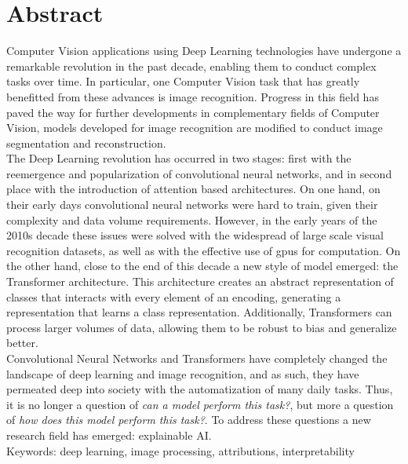 \chapter*{Abstract}
Computer Vision applications using Deep Learning technologies have undergone a remarkable 
revolution in the past decade, enabling them to conduct complex tasks over time. In particular, one 
Computer Vision task that has greatly benefitted from these advances is image recognition. 
Progress in this field has paved the way for further developments in complementary fields of 
Computer Vision, models developed for image recognition are modified to conduct image segmentation 
and reconstruction.\\

\noindent The Deep Learning revolution has occurred in two stages: first with the reemergence and 
popularization of convolutional neural networks, and in second place with the 
introduction of attention based architectures. On one hand, on their early days convolutional 
neural networks were hard to train, given their complexity and data volume requirements. 
However, in the early years of the 2010s decade these issues were solved with the widespread of 
large scale visual recognition datasets, as well as with the effective use of \glspl{gpu} for 
computation. On the other hand, close to the end of this decade a new style of model emerged: 
the Transformer architecture. This architecture creates an abstract representation of classes 
that interacts with every element of an encoding, generating a representation that learns a 
class representation. Additionally, Transformers can process larger volumes of data, 
allowing them to be robust to bias and generalize better.\\

\noindent Convolutional Neural Networks and Transformers have completely changed the landscape of 
deep learning and image recognition, and as such, they have permeated deep into society with the 
automatization of many daily tasks. Thus, it is no longer a question of \emph{can a model perform 
this task?}, but more a question of \emph{how does this model perform this task?}. To address these 
questions a new research field has emerged: explainable AI.\\

\vspace{0.5cm}
Keywords: deep learning, image processing, attributions, interpretability

